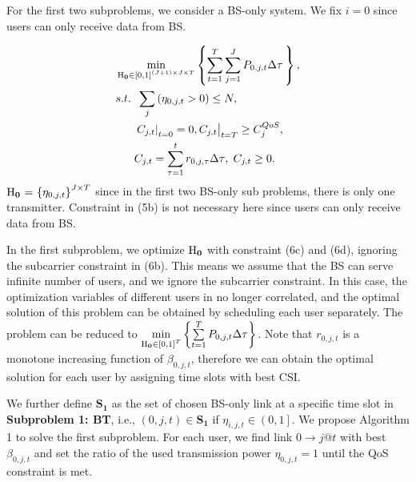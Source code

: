 \documentclass[conference]{IEEEtran}
\begin{document}
For the first two subproblems, we consider a BS-only system. We fix $i = 0$ since users can only receive data from BS.

\begin{subequations}
\begin{align}
& \mathop {\min }\limits_{{\mathbf{{\rm H}}}_{\mathbf{0}} \in {{\left[ {0,1} \right]}^{\left( {J + 1} \right) \times J \times T}}} \left\{ {\sum\limits_{t = 1}^T {\sum\limits_{j = 1}^J {{P_{0,j,t}}\Delta \tau } \,} } \right\} ,\\
& {s.t.} \;\; \sum\limits_j  {\left( {{\eta _{0,j,t}} > 0} \right)}   \le N, \\
& \;\;\;\;\;\; {\left. {{{\left. {{C_{j,t}}} \right|}_{t = 0}} = 0, {C_{j,t}}} \right|_{t = T}} \ge C_j^{QoS}, \\
& \;\;\;\;\;\; {C_{j,t}} = \sum\limits_{\tau  = 1}^t {{r_{0,j,\tau }}\Delta \tau } ,\; {C_{j,t}} \ge 0.
\end{align}
\end{subequations}
${{\mathbf{{\rm H}}}_{\mathbf{0}}}{\text{ = }}{\left\{ {{\eta _{0,j,t}}} \right\}^{J \times T}}$ since in the first two BS-only sub problems, there is only one transmitter. 
Constraint in (5b) is not necessary here since users can only receive data from BS.

In the first subproblem, we optimize ${{\mathbf{{\rm H}}}_{\mathbf{0}}}$ with constraint (6c) and (6d), ignoring the subcarrier constraint in (6b). This means we assume that the BS can serve infinite number of users, and we ignore the subcarrier constraint. In this case, the optimization variables of different users in no longer correlated, and the optimal solution of this problem can be obtained by scheduling each user separately. The problem can be reduced to $\mathop {\min }\limits_{{{\mathbf{{\rm H}}}_{\mathbf{0}}} \in {{\left[ {0,1} \right]}^T}} \left\{ {\sum\limits_{t = 1}^T {{P_{0,j,t}}\Delta \tau } } \right\}$. Note that ${r_{0,j,t}}$ is a monotone increasing function of ${\beta _{0,j,t}}$, therefore we can obtain the optimal solution for each user by assigning time slots with best CSI. 

We further define ${{\mathbf{S}}_{\mathbf{1}}}$ as the set of chosen BS-only link at a specific time slot in \textbf{Subproblem 1: BT}, i.e., $\left( {0,j,t} \right) \in {\mathbf{S}}_{\mathbf{1}}$ if ${\eta _{i,j,t}} \in \left( {0,1} \right]$. We propose Algorithm 1 to solve the first subproblem.
For each user, we find link $0 \to j@t$ with best ${\beta _{0,j,t}}$ and set the ratio of the used transmission power ${\eta _{0,j,t} = 1}$ until the QoS constraint is met.
\end{document}
